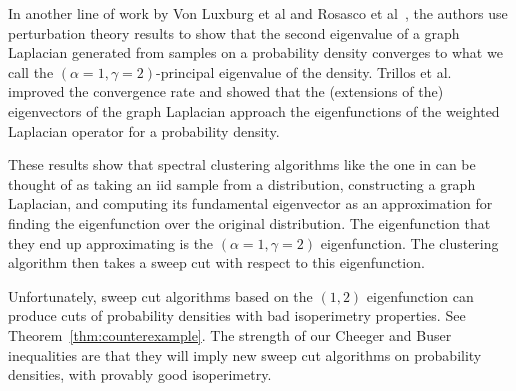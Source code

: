 In another line of work by Von Luxburg et al and Rosasco et
al~\cite{von2008consistency,rosasco2010learning}, the authors use
perturbation theory results to show that the second eigenvalue of
a graph Laplacian generated from samples on a probability
density converges to what we call the $(\alpha = 1, \gamma =
2)$-principal eigenvalue of the density. Trillos et
al.~\cite{TrillosRate15,TrillosVariational15} improved the convergence
rate and showed that the (extensions of the) eigenvectors of the graph
Laplacian approach the eigenfunctions of the weighted Laplacian
operator for a probability density. 

These results show that
spectral clustering algorithms like the one in
\cite{NgSpectral01} can be thought of as taking an iid sample
from a distribution, constructing a graph Laplacian, and computing its
fundamental eigenvector as an approximation for finding the
eigenfunction over the original
distribution. The eigenfunction that they end up approximating is
the $(\alpha = 1, \gamma = 2)$ eigenfunction. The clustering algorithm
then takes a sweep cut with respect to this eigenfunction.

Unfortunately, sweep cut
algorithms based on the $(1, 2)$ eigenfunction can produce cuts
of probability densities with bad isoperimetry properties. See
Theorem~\ref{thm:counterexample}. The strength of our Cheeger and Buser
inequalities are that they will imply new sweep cut algorithms on
probability densities, with provably good isoperimetry.
% 
% 
% 

